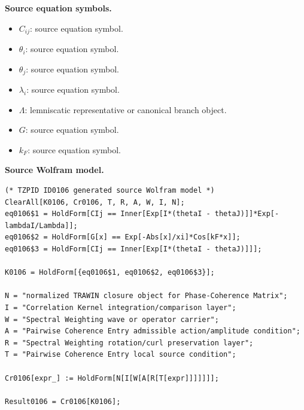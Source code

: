 \begin{minipage}[t]{0.49\linewidth}
\begingroup
\small
\raggedright
\textbf{Source equation symbols.}\par
\begin{itemize}[leftmargin=1.35em,itemsep=1pt,topsep=1pt,parsep=0pt]
    \item $C_{ij}$: source equation symbol.
    \item $\theta_i$: source equation symbol.
    \item $\theta_j$: source equation symbol.
    \item $\lambda_i$: source equation symbol.
    \item $\Lambda$: lemniscatic representative or canonical branch object.
    \item $G$: source equation symbol.
    \item $k_F$: source equation symbol.
\end{itemize}
\endgroup
\end{minipage}\hfill
\begin{minipage}[t]{0.47\linewidth}
\begingroup
\scriptsize
\raggedright
\textbf{Source Wolfram model.}\par
\begin{Verbatim}[fontsize=\tiny,breaklines=true,breakanywhere=true]
(* TZPID ID0106 generated source Wolfram model *)
ClearAll[K0106, Cr0106, T, R, A, W, I, N];
eq0106$1 = HoldForm[CIj == Inner[Exp[I*(thetaI - thetaJ)]]*Exp[-lambdaI/Lambda]];
eq0106$2 = HoldForm[G[x] == Exp[-Abs[x]/xi]*Cos[kF*x]];
eq0106$3 = HoldForm[CIj == Inner[Exp[I*(thetaI - thetaJ)]]];

K0106 = HoldForm[{eq0106$1, eq0106$2, eq0106$3}];

N = "normalized TRAWIN closure object for Phase-Coherence Matrix";
I = "Correlation Kernel integration/comparison layer";
W = "Spectral Weighting wave or operator carrier";
A = "Pairwise Coherence Entry admissible action/amplitude condition";
R = "Spectral Weighting rotation/curl preservation layer";
T = "Pairwise Coherence Entry local source condition";

Cr0106[expr_] := HoldForm[N[I[W[A[R[T[expr]]]]]]];

Result0106 = Cr0106[K0106];
\end{Verbatim}
\endgroup
\end{minipage}

